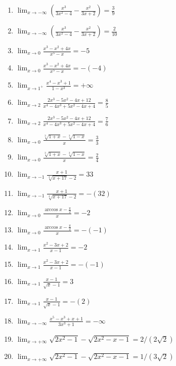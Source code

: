 \documentclass[11pt,a4paper]{article}
\begin{document}
\begin{enumerate}
\item $\displaystyle \lim_{x \to -\infty} \left(\frac{x^{3}}{3x^{2} - 4} - \frac{x^{2}}{3x + 2}\right) = \frac{3}{9}$
\item $\displaystyle \lim_{x \to -\infty} \left(\frac{x^{3}}{3x^{2} - 4} - \frac{x^{2}}{3x + 2}\right) = \frac{2}{10}$
\item $\displaystyle \lim_{x \to 0} \frac{x^{3} - x^{2} + 4x}{x^{5} - x} = -5$
\item $\displaystyle \lim_{x \to 0} \frac{x^{3} - x^{2} + 4x}{x^{5} - x} = -\left(-4\right)$
\item $\displaystyle \lim_{x \to 1^{+}} \frac{x^{4} - x^{3} + 1}{1 - x^{3}} = +\infty$
\item $\displaystyle \lim_{x \to 2} \frac{2x^{3} - 5x^{2} - 4x + 12}{x^{4} - 4x^{3} + 5x^{2} - 4x + 4} = \frac{8}{5}$
\item $\displaystyle \lim_{x \to 2} \frac{2x^{3} - 5x^{2} - 4x + 12}{x^{4} - 4x^{3} + 5x^{2} - 4x + 4} = \frac{7}{6}$
\item $\displaystyle \lim_{x \to 0} \frac{\sqrt[3]{1 + x} - \sqrt[3]{1 - x}}{x} = \frac{3}{3}$
\item $\displaystyle \lim_{x \to 0} \frac{\sqrt[3]{1 + x} - \sqrt[3]{1 - x}}{x} = \frac{2}{4}$
\item $\displaystyle \lim_{x \to -1} \frac{x + 1}{\sqrt[4]{x + 17} - 2} = 33$
\item $\displaystyle \lim_{x \to -1} \frac{x + 1}{\sqrt[4]{x + 17} - 2} = -\left(32\right)$
\item $\displaystyle \lim_{x \to 0} \frac{\arccos x - \frac{\pi}{2}}{x} = -2$
\item $\displaystyle \lim_{x \to 0} \frac{\arccos x - \frac{\pi}{2}}{x} = -\left(-1\right)$
\item $\displaystyle \lim_{x \to 1} \frac{x^{2} - 3x + 2}{x - 1} = -2$
\item $\displaystyle \lim_{x \to 1} \frac{x^{2} - 3x + 2}{x - 1} = -\left(-1\right)$
\item $\displaystyle \lim_{x \to 1} \frac{x - 1}{\sqrt{x} - 1} = 3$
\item $\displaystyle \lim_{x \to 1} \frac{x - 1}{\sqrt{x} - 1} = -\left(2\right)$
\item $\displaystyle \lim_{x \to -\infty} \frac{x^{5} - x^{3} + x + 1}{3x^{3} + 1} = -\infty$
\item $\displaystyle \lim_{x \to +\infty} \sqrt{2x^{2} - 1} - \sqrt{2x^{2} - x - 1} = 2/(2\sqrt{2})$
\item $\displaystyle \lim_{x \to +\infty} \sqrt{2x^{2} - 1} - \sqrt{2x^{2} - x - 1} = 1/(3\sqrt{2})$

\end{enumerate}
\end{document}
